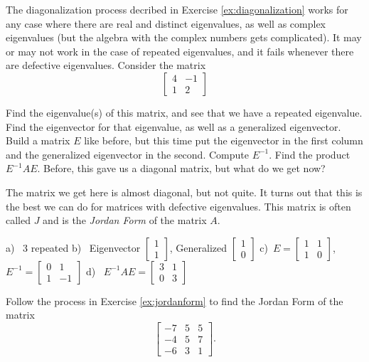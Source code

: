 \begin{exercise} \label{ex:jordanform}
The diagonalization process decribed in Exercise \ref{ex:diagonalization} works for any case where there are real and distinct eigenvalues, as well as complex eigenvalues (but the algebra with the complex numbers gets complicated). It may or may not work in the case of repeated eigenvalues, and it fails whenever there are defective eigenvalues. Consider the matrix
\[ \begin{bmatrix} 4 & -1 \\ 1 & 2 \end{bmatrix} \]
\begin{tasks}
\task Find the eigenvalue(s) of this matrix, and see that we have a repeated eigenvalue. 
\task Find the eigenvector for that eigenvalue, as well as a generalized eigenvector.
\task Build a matrix $E$ like before, but this time put the eigenvector in the first column and the generalized eigenvector in the second. Compute $E^{-1}$. 
\task Find the product $E^{-1}AE$. Before, this gave us a diagonal matrix, but what do we get now? 
\end{tasks}
The matrix we get here is almost diagonal, but not quite. It turns out that this is the best we can do for matrices with defective eigenvalues. This matrix is often called $J$ and is the \emph{Jordan Form} of the matrix $A$. 
\end{exercise}
\comboSol{%
}
{%
a)~ 3 repeated \quad b)~ Eigenvector $\left[\begin{smallmatrix}  1 \\ 1 \end{smallmatrix}\right]$, Generalized $\left[\begin{smallmatrix} 1 \\ 0 \end{smallmatrix}\right]$ \quad c)~$E = \left[\begin{smallmatrix} 1 & 1 \\ 1 & 0 \end{smallmatrix}\right]$, $E^{-1} = \left[\begin{smallmatrix}  0 & 1 \\ 1 & -1 \end{smallmatrix}\right]$ \quad d)~ $E^{-1}AE = \left[\begin{smallmatrix} 3 & 1 \\ 0 & 3 \end{smallmatrix}\right]$
}

\begin{exercise}\ansMark%
Follow the process in Exercise \ref{ex:jordanform} to find the Jordan Form of the matrix
\[ \begin{bmatrix} -7 & 5 & 5 \\ -4 & 5 & 7 \\ -6 & 3 & 1 \end{bmatrix}. \]
\end{exercise}
\exsol{%
$\left[\begin{smallmatrix} 3 & 0 & 0 \\ 0 & -2 & 1 \\ 0 & 0 & -2 \end{smallmatrix}\right]$
}
